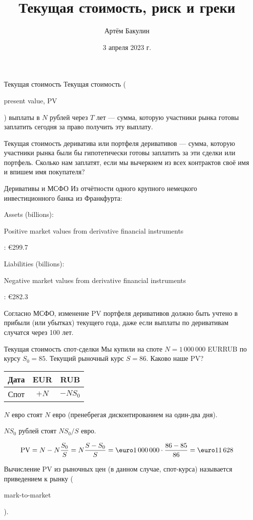 \documentclass{beamer}
\title{Текущая стоимость, риск и греки}
\author{Артём Бакулин}
\date{3 апреля 2023 г.}
\renewcommand{\EUR}[1]{\textup{\euro}#1}
\newcommand{\en}[1]{\begin{otherlanguage}{english}#1\end{otherlanguage}}
\begin{document}
\begin{frame}
\titlepage
\end{frame}



\begin{frame}{Текущая стоимость}
\justify
\alert{Текущая стоимость} (\en{present value, PV}) выплаты в $N$ рублей через $T$ лет 
--- сумма, которую участники рынка готовы заплатить сегодня за право получить эту 
выплату.

\justify
Текущая стоимость дериватива или портфеля деривативов --- сумма, которую участники рынка были бы гипотетически готовы заплатить за эти сделки или портфель. Сколько нам заплатят, если мы вычеркнем из всех контрактов своё имя и впишем имя покупателя?

\end{frame}



\begin{frame}{Деривативы и МСФО}
\justify
Из отчётности одного крупного немецкого инвестиционного банка из Франкфурта:

\justify
Assets (billions):

\en{Positive market values from derivative financial instruments}: \EUR{299.7}

\justify
Liabilities (billions):

\en{Negative market values from derivative financial instruments}: \EUR{282.3}

\justify
Согласно МСФО, изменение PV портфеля деривативов должно быть учтено в прибыли (или убытках) текущего года, даже если выплаты по деривативам случатся через 100 лет.
\end{frame}



\begin{frame}{Текущая стоимость спот-сделки}
\justify
Мы купили на споте $N=1\,000\,000$ EURRUB по курсу $S_0 = 85$. Текущий рыночный курс $S=86$. Каково наше PV?

\justify
\centering
\begin{tabular}{c|c|c}
Дата & EUR  & RUB \\ \hline
Спот & $+N$ & $-NS_0$
\end{tabular}

\justify
$N$ евро стоят $N$ евро (пренебрегая дисконтированием на один-два дня).

\justify
$NS_0$ рублей стоят $NS_0/S$ евро.

\begin{align*}
\text{PV} = N - N\frac{S_0}{S} = N\frac{S - S_0}{S} = \EUR{1\,000\,000} \cdot \frac{86 - 85}{86} = \EUR{11\,628}
\end{align*}

\justify
Вычисление PV из рыночных цен (в данном случае, спот-курса) называется \alert{приведением к рынку} (\en{mark-to-market}).
\end{frame}
\end{document}

